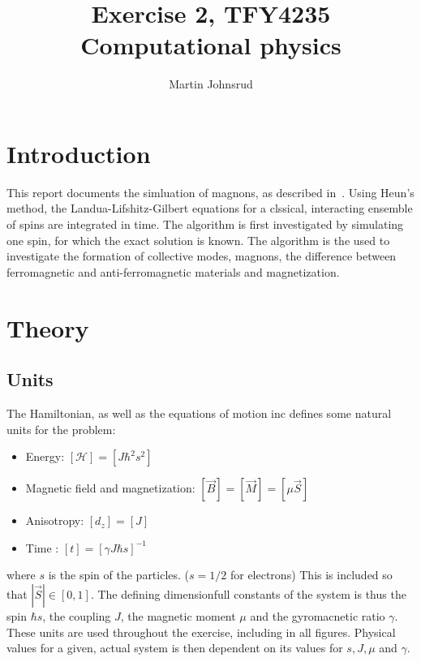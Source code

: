 \documentclass{article}
\title{Exercise 2, TFY4235 Computational physics}
\author{Martin Johnsrud}
\date{}
\begin{document}
    \maketitle
    \section*{Introduction}
    This report documents the simluation of magnons, as described in~\cite{exercise}. Using Heun's method, the Landua-Lifshitz-Gilbert equations for a clssical, interacting ensemble of spins are integrated in time. The algorithm is first investigated by simulating one spin, for which the exact solution is known. The algorithm is the used to investigate the formation of collective modes, magnons, the difference between ferromagnetic and anti-ferromagnetic materials and magnetization. 

    \section*{Theory}
    \subsection*{Units}
    The Hamiltonian, as well as the equations of motion inc \cite{exercise} defines some natural units for the problem: 
    \begin{itemize}
        \item Energy: $[\mathcal H] = [J \hbar^2 s^2]$
        \item Magnetic field and magnetization: $[\vec B] = [\vec M] = [\mu \vec S ]$
        \item Anisotropy: $[d_z] = [J]$
        \item Time : $[t] = [\gamma J \hbar s]^{-1}$
    \end{itemize}
     where $s$ is the spin of the particles. ($s=1/2$ for electrons) This is included so that $|\vec S|\in[0, 1]$. The defining dimensionfull constants of the system is thus the spin $\hbar s$, the coupling $J$, the magnetic moment $\mu$ and the gyromacnetic ratio $\gamma$. These units are used throughout the exercise, including in all figures. Physical values for a given, actual system is then dependent on its values for $s, J, \mu$ and $\gamma$.
\end{document}
